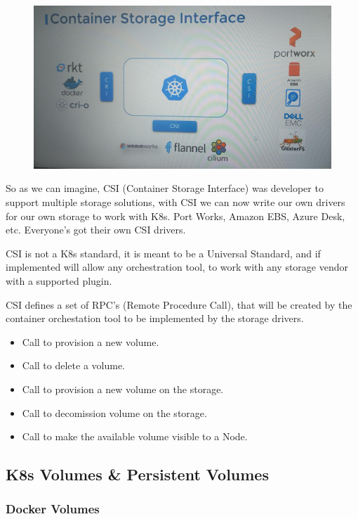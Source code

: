 \documentclass{article}
\begin{document}
\begin{figure}[H]
    \includegraphics[width=\textwidth]{pictures/st3.png}
\end{figure}

So as we can imagine, CSI (Container Storage Interface) was developer to support multiple storage solutions, with CSI we can now write our own drivers for our own storage to work with K8s. Port Works, Amazon EBS, Azure Desk, etc. Everyone's got their own CSI drivers.

CSI is not a K8s standard, it is meant to be a Universal Standard, and if implemented will allow any orchestration tool,
to work with any storage vendor with a supported plugin.

CSI defines a set of RPC's (Remote Procedure Call), that will be created by the container orchestation tool
to be implemented by the storage drivers.
\begin{itemize}
    \item Call to provision a new volume.
    \item Call to delete a volume.
    \item Call to provision a new volume on the storage.
    \item Call to decomission volume on the storage.
    \item Call to make the available volume visible to a Node.
\end{itemize}

\subsection{K8s Volumes \& Persistent Volumes}

\subsubsection{Docker Volumes}
\end{document}

